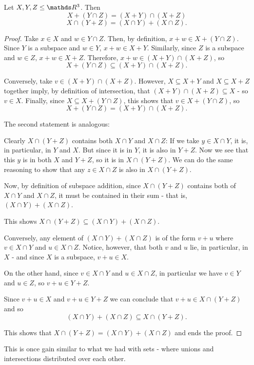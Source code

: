\begin{lemma}
	Let $X,Y,Z\leq \R^3$. Then $$X+(Y\cap Z)=(X+Y)\cap(X+Z)$$$$X\cap(Y+Z)=(X\cap Y)+(X\cap Z).$$
\end{lemma}
\begin{proof}
	Take $x\in X$ and $w\in Y\cap Z$. Then, by definition, $x+w\in X+(Y\cap Z)$. Since $Y$ is a subspace and $w\in Y$, $x+w\in X+Y$. Similarly, since $Z$ is a subspace and $w\in Z$, $x+w\in X+Z$. Therefore, $x+w\in (X+Y)\cap(X+Z)$, so 
	\[X+(Y\cap Z)\subseteq (X+Y)\cap(X+Z).\]
	
	\bigskip
	Conversely, take $v\in(X+Y)\cap(X+Z)$. However, $X\subseteq X+Y$ and $X\subseteq X+Z$ together imply, by definition of intersection, that $(X+Y)\cap(X+Z)\subseteq X$ - so $v\in X$. Finally, since $X\subseteq X+(Y\cap Z)$, this shows that $v\in X+(Y\cap Z)$, so
	\[X+(Y\cap Z)=(X+Y)\cap(X+Z).\]
	
	\bigskip
	The second statement is analogous:
	
	Clearly $X\cap(Y+Z)$ contains both $X\cap Y$ and $X\cap Z$: If we take $y\in X\cap Y$, it is, in particular, in $Y$ and $X$. But since it is in $Y$, it is also in $Y+Z$. Now we see that this $y$ is in both $X$ and $Y+Z$, so it is in $X\cap(Y+Z)$. We can do the same reasoning to show that any $z\in X\cap Z$ is also in $X\cap (Y+Z)$.
	
	Now, by definition of subspace addition, since $X\cap(Y+Z)$ contains both of $X\cap Y$ and $X\cap Z$, it must be contained in their sum - that is, $(X\cap Y)+(X\cap Z)$.
	
	This shows $X\cap(Y+Z)\subseteq (X\cap Y)+(X\cap Z)$.
	
	\bigskip
	Conversely, any element of $(X\cap Y)+(X\cap Z)$ is of the form $v+u$ where $v\in X\cap Y$ and $u\in X\cap Z$. Notice, however, that both $v$ and $u$ lie, in particular, in $X$ - and since $X$ is a subspace, $v+u\in X$.
	
	On the other hand, since $v\in X\cap Y$ and $u\in X\cap Z$, in particular we have $v\in Y$ and $u\in Z$, so $v+u\in Y+Z$.
	
	Since $v+u\in X$ and $v+u\in Y+Z$ we can conclude that $v+u\in X\cap(Y+Z)$ and so
	\[(X\cap Y)+(X\cap Z)\subseteq X\cap(Y+Z).\]
	
	This shows that $X\cap(Y+Z)=(X\cap Y)+(X\cap Z)$ and ends the proof.
\end{proof}
\begin{rmk}
	This is once gain similar to what we had with sets - where unions and intersections distributed over each other.
\end{rmk}

